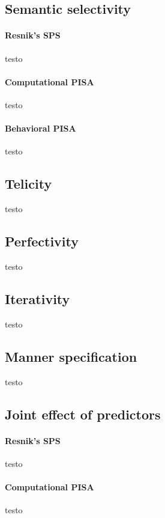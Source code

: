 \subsection{Semantic selectivity} 

\paragraph{Resnik's SPS} testo

\paragraph{Computational PISA} testo

\paragraph{Behavioral PISA} testo

\subsection{Telicity} 

testo

\subsection{Perfectivity} 

testo

\subsection{Iterativity}

testo

\subsection{Manner specification} 

testo

\subsection{Joint effect of predictors} 



\paragraph{Resnik's SPS} testo

\paragraph{Computational PISA} testo

